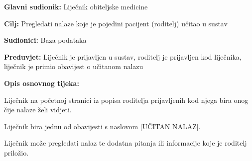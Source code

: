 					\noindent {}
					\begin{packed_item}
						
						\item \textbf{Glavni sudionik: }Liječnik obiteljske medicine
						\item  \textbf{Cilj:} Pregledati nalaze koje je pojedini pacijent (roditelj) učitao u sustav
						\item  \textbf{Sudionici:} Baza podataka
						\item  \textbf{Preduvjet:} Liječnik je prijavljen u sustav, roditelj je prijavljen kod liječnika, liječnik je primio obavijest o učitanom nalazu
						\item  \textbf{Opis osnovnog tijeka:}
						
						\item[] \begin{packed_enum}
							
							\item Liječnik na početnoj stranici iz popisa roditelja prijavljenih kod njega bira onog čije nalaze želi vidjeti.
							\item Liječnik bira jednu od obavijesti s naslovom [UČITAN NALAZ].
							\item Liječnik može pregledati nalaz te dodatna pitanja ili informacije koje je roditelj priložio.
						\end{packed_enum}
						
						
					\end{packed_item}
					
